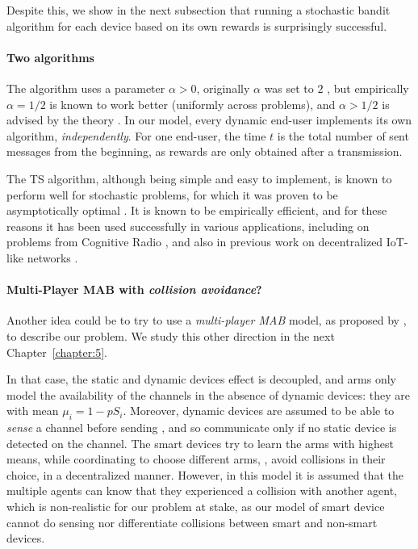 Despite this, we show in the next subsection that running a stochastic bandit algorithm for each device based on its own rewards is surprisingly successful.

\paragraph{Two algorithms}

The \UCB{} algorithm uses a parameter $\alpha > 0$, originally $\alpha$ was set to $2$ \cite{Auer02}, but empirically $\alpha = 1/2$ is known to work better (uniformly across problems), and $\alpha > 1/2$ is advised by the theory \cite{Bubeck12}.
%
In our model, every dynamic end-user implements its own \UCB{} algorithm, \emph{independently}.
For one end-user, the time $t$ is the total number of sent messages from the beginning, as rewards are only obtained after a transmission.

The TS algorithm, although being simple and easy to implement, is known to perform well for stochastic problems, for which it was proven to be asymptotically optimal \cite{AgrawalGoyal11,Kaufmann12Thompson}.
It is known to be empirically efficient, and for these reasons it has been used successfully in various applications, including on problems from Cognitive Radio \cite{Toldov16,Mitton16}, and also in previous work on decentralized IoT-like networks \cite{Darak16}.


\paragraph{Multi-Player MAB with \emph{collision avoidance}?}

Another idea could be to try to use a \emph{multi-player MAB} model, as proposed by \cite{Zhao10}, to describe our problem.
We study this other direction in the next Chapter~\ref{chapter:5}.

In that case, the static and dynamic devices effect is decoupled, and arms only model the availability of the channels in the absence of dynamic devices: they are \iid{} with mean $\mu_i = 1 - p S_i$.
Moreover, dynamic devices are assumed to be able to \emph{sense} a channel before sending \cite{Zhao10}, and so communicate only if no static device is detected on the channel.
The smart devices try to learn the arms with highest means, while coordinating to choose different arms, \ie, avoid collisions in their choice, in a decentralized manner.
However, in this model it is assumed that the multiple agents can know that they experienced a collision with another agent, which is non-realistic for our problem at stake, as our model of smart device cannot do sensing nor differentiate collisions between smart and non-smart devices.


